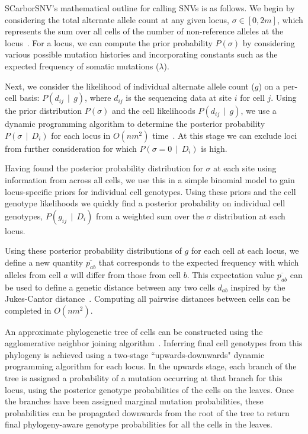\documentclass[../../main.tex]{subfiles}
\begin{document}
SCarborSNV's mathematical outline for calling SNVs is as follows.
We begin by considering the total alternate allele count at any given locus, $\sigma\in [0,2m]$, which represents the sum over all cells of the number of non-reference alleles at the locus~\cite{monovar, listatistical}.
For a locus, we can compute the prior probability $P(\sigma)$ by considering various possible mutation histories and incorporating constants such as the expected frequency of somatic mutations ($\lambda$).

Next, we consider the likelihood of individual alternate allele count ($g$) on a per-cell basis: $P(d_{ij}\,\mid\,g)$, where $d_{ij}$ is the sequencing data at site $i$ for cell $j$.
Using the prior distribution $P(\sigma)$ and the cell likelihoods $P(d_{ij}\,\mid\,g)$, we use a dynamic programming algorithm to determine the posterior probability $P(\sigma\,\mid\,D_i)$ for each locus in $O(nm^2)$ time~\cite{monovar, ledurbin, listatistical}.
At this stage we can exclude loci from further consideration for which $P(\sigma = 0\,\mid\, D_i)$ is high.

Having found the posterior probability distribution for $\sigma$ at each site using information from across all cells, we use this in a simple binomial model to gain locus-specific priors for individual cell genotypes.
Using these priors and the cell genotype likelihoods we quickly find a posterior probability on individual cell genotypes, $P(g_{ij}\,\mid\, D_i)$ from a weighted sum over the $\sigma$ distribution at each locus.

Using these posterior probability distributions of $g$ for each cell at each locus, we define a new quantity $\overline{p_{ab}}$ that corresponds to the expected frequency with which alleles from cell $a$ will differ from those from cell $b$.
This expectation value $\overline{p_{ab}}$ can be used to define a genetic distance between any two cells $d_{ab}$ inspired by the Jukes-Cantor distance~\cite{BSA, JC}.
Computing all pairwise distances between cells can be completed in $O(nm^2)$.

An approximate phylogenetic tree of cells can be constructed using the agglomerative neighbor joining algorithm~\cite{BSA, NJ}.
Inferring final cell genotypes from this phylogeny is achieved using a two-stage ``upwards-downwards" dynamic programming algorithm for each locus.
In the upwards stage, each branch of the tree is assigned a probability of a mutation occurring at that branch for this locus, using the posterior genotype probabilities of the cells on the leaves.
Once the branches have been assigned marginal mutation probabilities, these probabilities can be propagated downwards from the root of the tree to return final phylogeny-aware genotype probabilities for all the cells in the leaves.
\end{document}
